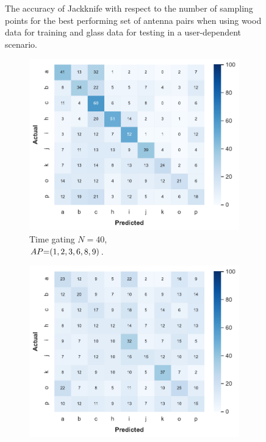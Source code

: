 \begin{figure}[ht]
  \vspace{-6pt}
  \caption{The accuracy of Jackknife with respect to the number of sampling points for the best performing set of antenna pairs when using wood data for training and glass data for testing in a user-dependent scenario.}
  \label{fig:radar-experiments:through-materials:wood-glass-samples}
\end{figure}

\begin{figure}[ht]
  \begin{subfigure}{.49\textwidth}
    \centering
    \includegraphics[width=.99\linewidth]{Figures/RadarExperiments/Datasets/ThroughMaterials/Wood+Glass/confusion-timegating-ud.pdf}
    \vspace{-5pt}
    \captionsetup{width=.99\linewidth}
    \caption{Time gating $N{=}40$, \\ $\splitatcommas{AP{=}(1, 2, 3, 6, 8, 9)}$.}
    \label{fig:radar-experiments:through-materials:wood-glass-confusion:timegating-ud}
  \end{subfigure}
  \begin{subfigure}{.49\textwidth}
    \centering
    \includegraphics[width=.99\linewidth]{Figures/RadarExperiments/Datasets/ThroughMaterials/Wood+Glass/confusion-filtering-ud.pdf}

\end{subfigure}
\end{figure}
